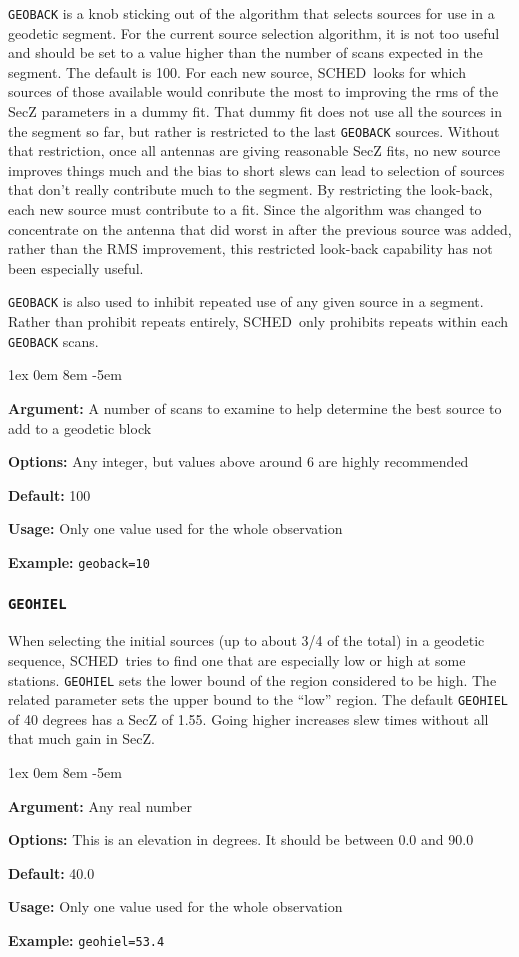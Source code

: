 \documentclass{report}
\newcommand{\schedb}{{\sc SCHED~}}
\newcommand{\rcwbox}[5]{
  \begin{list}{}{\parsep 1ex  \itemsep 0em
                 \leftmargin 8em  \itemindent -5em }
    \item {\bf Argument:} #1
    \item {\bf Options:}  #2
    \item {\bf Default:}  #3
    \item {\bf Usage:}    #4
    \item {\bf Example:}  #5
  \end{list}
}
\begin{document}
{\tt GEOBACK} is a knob sticking out of the algorithm that selects
sources for use in a geodetic segment.  For the current source
selection algorithm, it is not too useful and should be set to a value
higher than the number of scans expected in the segment.  The default
is 100.  For each new source, \schedb looks for which sources of those
available would conribute the most to improving the rms of the SecZ
parameters in a dummy fit.  That dummy fit does not use all the
sources in the segment so far, but rather is restricted to the last
{\tt GEOBACK} sources.  Without that restriction, once all antennas
are giving reasonable SecZ fits, no new source improves things much
and the bias to short slews can lead to selection of sources that
don't really contribute much to the segment.  By restricting the
look-back, each new source must contribute to a fit.  Since the
algorithm was changed to concentrate on the antenna that did worst in
after the previous source was added, rather than the RMS improvement,
this restricted look-back capability has not been especially useful.

{\tt GEOBACK} is also used to inhibit repeated use of any given source
in a segment.  Rather than prohibit repeats entirely, \schedb only
prohibits repeats within each {\tt GEOBACK} scans.

\rcwbox
{A number of scans to examine to help determine the best source to add
to a geodetic block}
{Any integer, but values above around 6 are highly recommended}
{100}
{Only one value used for the whole observation}
{{\tt geoback=10}}

\subsubsection{\label{MP:GEOHIEL}{\tt GEOHIEL}}

When selecting the initial sources (up to about 3/4 of the total)
in a geodetic sequence, \schedb tries to find one that are especially
low or high at some stations.  {\tt GEOHIEL} sets the lower bound
of the region considered to be high.  The related parameter
 sets the upper bound to the
``low'' region.  The default {\tt GEOHIEL} of 40 degrees has a
SecZ of 1.55.  Going higher increases slew times without all that
much gain in SecZ.

\rcwbox
{Any real number}
{This is an elevation in degrees.  It should be between 0.0 and 90.0}
{40.0}
{Only one value used for the whole observation}
{{\tt geohiel=53.4}}
\end{document}
